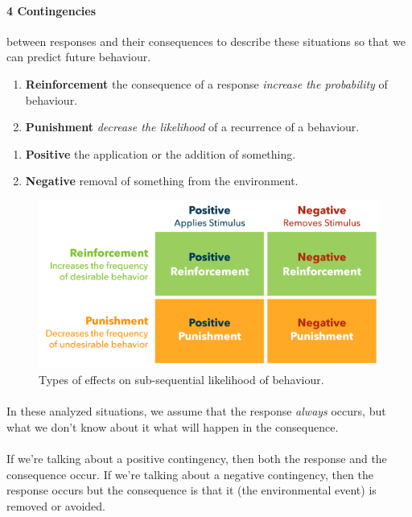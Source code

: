 \documentclass{article}
\begin{document}
	\paragraph{4 Contingencies} between responses and their consequences to describe these situations so that we can predict future behaviour.
	\begin{enumerate}
		\item \textbf{Reinforcement} the consequence of a response \emph{increase the probability} of behaviour.
		\item \textbf{Punishment} \emph{decrease the likelihood} of a recurrence of a behaviour.
	\end{enumerate}
	\begin{enumerate}
		\item \textbf{Positive} the application or the addition of something.
		\item \textbf{Negative} removal of something from the environment.
	\end{enumerate}
	\begin{figure}
		\centering
		\includegraphics[width = \linewidth]{pic/reinforcing_types}
		\caption{Types of effects on sub-sequential likelihood of behaviour.}
	\end{figure}
	\paragraph{} In these analyzed situations, we assume that the response \emph{always} occurs, but what we don't know about it what will happen in the consequence.
	\paragraph{} If we're talking about a positive contingency, then both the response and the consequence occur. If we're talking about a negative contingency, then the response occurs but the consequence is that it (the environmental event) is removed or avoided.
\end{document}
